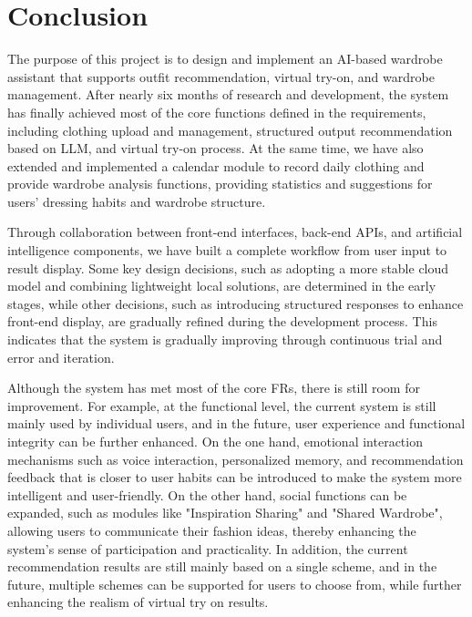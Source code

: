 \chapter{Conclusion}
\label{ch:conclusion}
The purpose of this project is to design and implement an AI-based wardrobe assistant that supports outfit recommendation, virtual try-on, and wardrobe management. After nearly six months of research and development, the system has finally achieved most of the core functions defined in the requirements, including clothing upload and management, structured output recommendation based on LLM, and virtual try-on process. At the same time, we have also extended and implemented a calendar module to record daily clothing and provide wardrobe analysis functions, providing statistics and suggestions for users' dressing habits and wardrobe structure. 

Through collaboration between front-end interfaces, back-end APIs, and artificial intelligence components, we have built a complete workflow from user input to result display. Some key design decisions, such as adopting a more stable cloud model and combining lightweight local solutions, are determined in the early stages, while other decisions, such as introducing structured responses to enhance front-end display, are gradually refined during the development process. This indicates that the system is gradually improving through continuous trial and error and iteration.

Although the system has met most of the core FRs, there is still room for improvement. For example, at the functional level, the current system is still mainly used by individual users, and in the future, user experience and functional integrity can be further enhanced. On the one hand, emotional interaction mechanisms such as voice interaction, personalized memory, and recommendation feedback that is closer to user habits can be introduced to make the system more intelligent and user-friendly. On the other hand, social functions can be expanded, such as modules like "Inspiration Sharing" and "Shared Wardrobe", allowing users to communicate their fashion ideas, thereby enhancing the system's sense of participation and practicality. In addition, the current recommendation results are still mainly based on a single scheme, and in the future, multiple schemes can be supported for users to choose from, while further enhancing the realism of virtual try on results.